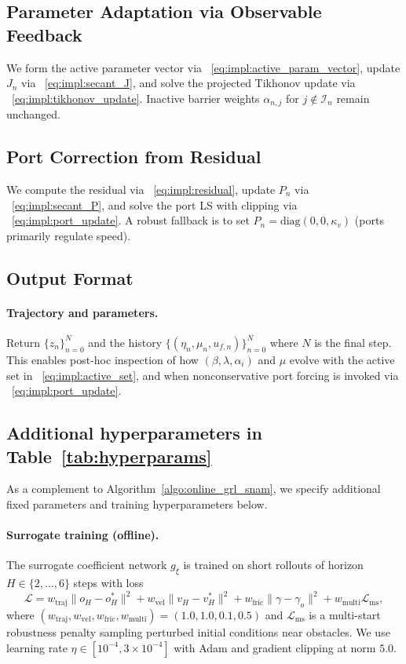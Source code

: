 \documentclass{article} %
\begin{document}
\subsection{Parameter Adaptation via Observable Feedback}
\label{subsec:parameter_adaptation}

We form the active parameter vector via ~\cref{eq:impl:active_param_vector}, update $J_n$ via ~\cref{eq:impl:secant_J},
and solve the projected Tikhonov update via ~\cref{eq:impl:tikhonov_update}. Inactive barrier weights $\alpha_{n,j}$ for
$j\notin\mathcal{I}_n$ remain unchanged.

\subsection{Port Correction from Residual}
\label{subsec:port_correction}

We compute the residual via ~\cref{eq:impl:residual}, update $P_n$ via ~\cref{eq:impl:secant_P}, and solve the port LS with
clipping via ~\cref{eq:impl:port_update}. A robust fallback is to set $P_n=\mathrm{diag}(0,0,\kappa_v)$ (ports primarily regulate speed).

\subsection{Output Format}
\label{subsec:output_format}

\paragraph{Trajectory and parameters.}
Return $\{z_n\}_{n=0}^{N}$ and the history $\{(\eta_n,\mu_n,u_{f,n})\}_{n=0}^{N}$ where $N$ is the final step. This enables post-hoc
inspection of how $(\beta,\lambda,\alpha_i)$ and $\mu$ evolve with the active set in ~\cref{eq:impl:active_set}, and when nonconservative
port forcing is invoked via ~\cref{eq:impl:port_update}.

\subsection{Additional hyperparameters in Table~\ref{tab:hyperparams}}
\label{subsec:hyperparam}

As a complement to Algorithm~\ref{algo:online_grl_snam}, we specify additional fixed parameters and training hyperparameters below.

\paragraph{Surrogate training (offline).}
The surrogate coefficient network $g_\xi$ is trained on short rollouts of horizon $H \in \{2,\ldots,6\}$ steps with loss
\[
\mathcal{L} = w_{\mathrm{traj}}\|o_H - o_H^*\|^2 + w_{\mathrm{vel}}\|v_H - v_H^*\|^2 + w_{\mathrm{fric}}\|\gamma - \gamma_o\|^2 + w_{\mathrm{multi}}\mathcal{L}_{\mathrm{ms}},
\]
where $(w_{\mathrm{traj}}, w_{\mathrm{vel}}, w_{\mathrm{fric}}, w_{\mathrm{multi}}) = (1.0, 1.0, 0.1, 0.5)$ and $\mathcal{L}_{\mathrm{ms}}$ is a multi-start robustness penalty sampling perturbed initial conditions near obstacles. We use learning rate $\eta \in [10^{-4}, 3 \times 10^{-4}]$ with Adam and gradient clipping at norm $5.0$.
\end{document}
